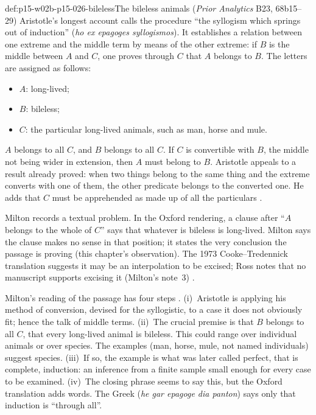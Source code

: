 \begin{hbexample}{def:p15-w02b-p15-026-bileless}{The bileless animals (\emph{Prior Analytics} B23, 68b15--29)}
Aristotle's longest account calls the procedure ``the syllogism which
springs out of induction'' (\emph{ho ex epagoges syllogismos}). It
establishes a relation between one extreme and the middle term by means of
the other extreme: if $B$ is the middle between $A$ and $C$, one proves
through $C$ that $A$ belongs to $B$. The letters are assigned as follows:
\begin{itemize}
\item $A$: long-lived;
\item $B$: bileless;
\item $C$: the particular long-lived animals, such as man, horse and mule.
\end{itemize}
$A$ belongs to all $C$, and $B$ belongs to all $C$. If $C$ is convertible
with $B$, the middle not being wider in extension, then $A$ must belong to
$B$. Aristotle appeals to a result already proved: when two things belong
to the same thing and the extreme converts with one of them, the other
predicate belongs to the converted one. He adds that $C$ must be
apprehended as made up of all the particulars
\cite[p.~4]{Milton2011InductionBeforeHume}.

Milton records a textual problem. In the Oxford rendering, a clause after
``$A$ belongs to the whole of $C$'' says that whatever is bileless is
long-lived. Milton says the clause makes no sense in that position; it
states the very conclusion the passage is proving (this chapter's
observation). The 1973 Cooke--Tredennick translation suggests it may be
an interpolation to be excised; Ross notes that no manuscript supports
excising it (Milton's note~3) \cite[p.~4]{Milton2011InductionBeforeHume}.
\end{hbexample}

Milton's reading of the passage has four steps
\cite[p.~5]{Milton2011InductionBeforeHume}. (i)~Aristotle is applying his
method of conversion, devised for the syllogistic, to a case it does not
obviously fit; hence the talk of middle terms. (ii)~The crucial premise is
that $B$ belongs to all $C$, that every long-lived animal is bileless.
This could range over individual animals or over species. The examples
(man, horse, mule, not named individuals) suggest species. (iii)~If so, the
example is what was later called perfect, that is complete, induction: an
inference from a finite sample small enough for every case to be examined.
(iv)~The closing phrase seems to say this, but the Oxford translation adds
words. The Greek (\emph{he gar epagoge dia panton}) says only that
induction is ``through all''.

